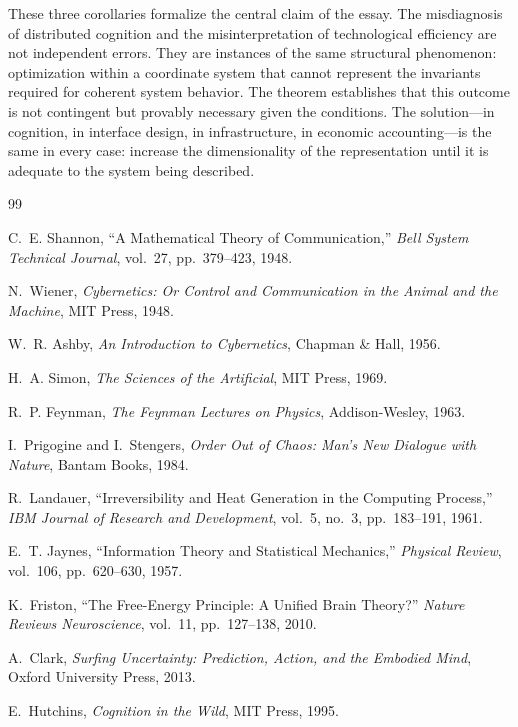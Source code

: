 \documentclass[12pt, a4paper]{article}
\begin{document}
\noindent These three corollaries formalize the central claim of the essay. The misdiagnosis of distributed cognition and the misinterpretation of technological efficiency are not independent errors. They are instances of the same structural phenomenon: optimization within a coordinate system that cannot represent the invariants required for coherent system behavior. The theorem establishes that this outcome is not contingent but provably necessary given the conditions. The solution---in cognition, in interface design, in infrastructure, in economic accounting---is the same in every case: increase the dimensionality of the representation until it is adequate to the system being described.


\begin{thebibliography}{99}

C.~E. Shannon,
``A Mathematical Theory of Communication,''
\emph{Bell System Technical Journal}, vol.~27, pp.~379--423, 1948.

N.~Wiener,
\emph{Cybernetics: Or Control and Communication in the Animal and the Machine},
MIT Press, 1948.

W.~R. Ashby,
\emph{An Introduction to Cybernetics},
Chapman \& Hall, 1956.

H.~A. Simon,
\emph{The Sciences of the Artificial},
MIT Press, 1969.

R.~P. Feynman,
\emph{The Feynman Lectures on Physics},
Addison-Wesley, 1963.

I.~Prigogine and I.~Stengers,
\emph{Order Out of Chaos: Man's New Dialogue with Nature},
Bantam Books, 1984.

R.~Landauer,
``Irreversibility and Heat Generation in the Computing Process,''
\emph{IBM Journal of Research and Development}, vol.~5, no.~3, pp.~183--191, 1961.

E.~T. Jaynes,
``Information Theory and Statistical Mechanics,''
\emph{Physical Review}, vol.~106, pp.~620--630, 1957.

K.~Friston,
``The Free-Energy Principle: A Unified Brain Theory?''
\emph{Nature Reviews Neuroscience}, vol.~11, pp.~127--138, 2010.

A.~Clark,
\emph{Surfing Uncertainty: Prediction, Action, and the Embodied Mind},
Oxford University Press, 2013.

E.~Hutchins,
\emph{Cognition in the Wild},
MIT Press, 1995.


\end{thebibliography}
\end{document}
